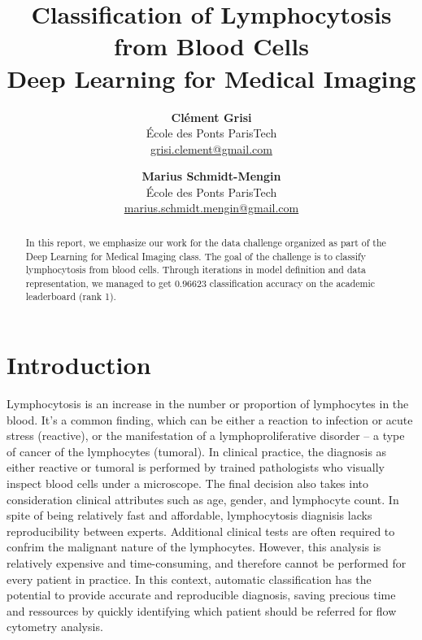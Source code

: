 \documentclass[final]{cvpr}
\begin{document}
	
	\title{Classification of Lymphocytosis from Blood Cells\\
		\vspace{1mm}
		\large \normalfont Deep Learning for Medical Imaging}
	
	\author{\textbf{Clément Grisi}\\
		École des Ponts ParisTech\\
		\small \url{grisi.clement@gmail.com}
	\and
	\textbf{Marius Schmidt-Mengin}\\
	École des Ponts ParisTech\\
	\small \url{marius.schmidt.mengin@gmail.com}
	}
	
	\maketitle
	
	\begin{abstract}
		In this report, we emphasize our work for the data challenge organized as part of the Deep Learning for Medical Imaging class. The goal of the challenge is to classify lymphocytosis from blood cells. Through iterations in model definition and data representation, we managed to get $0.96623$ classification accuracy on the academic leaderboard (rank 1).
	\end{abstract}
	
	\vspace{-3mm}
	
	\section{Introduction}
	
	Lymphocytosis is an increase in the number or proportion of lymphocytes in the blood. It's a common finding, which can be either a reaction to infection or acute stress (reactive), or the manifestation of a lymphoproliferative disorder -- a type of cancer of the lymphocytes (tumoral). In clinical practice, the diagnosis as either reactive or tumoral is performed by trained pathologists who visually inspect blood cells under a microscope. The final decision also takes into consideration clinical attributes such as age, gender, and lymphocyte count. In spite of being relatively fast and affordable, lymphocytosis diagnisis lacks reproducibility between experts. Additional clinical tests are often required to confrim the malignant nature of the lymphocytes. However, this analysis is relatively expensive and time-consuming, and therefore cannot be performed for every patient in practice. In this context, automatic classification has the potential to provide accurate and reproducible diagnosis, saving precious time and ressources by quickly identifying which patient should be referred for flow cytometry analysis.
	
\end{document}
